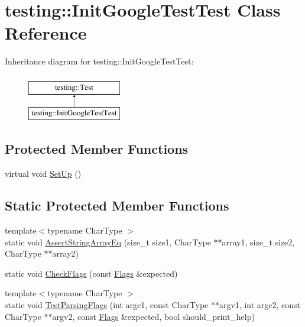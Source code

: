 \hypertarget{classtesting_1_1_init_google_test_test}{\section{testing\-:\-:Init\-Google\-Test\-Test Class Reference}
\label{classtesting_1_1_init_google_test_test}
}
Inheritance diagram for testing\-:\-:Init\-Google\-Test\-Test\-:\begin{figure}[H]
\begin{center}
\leavevmode
\includegraphics[height=2.000000cm]{classtesting_1_1_init_google_test_test}
\end{center}
\end{figure}
\subsection*{Protected Member Functions}
\begin{DoxyCompactItemize}
\item 
virtual void \hyperlink{classtesting_1_1_init_google_test_test_a49de9e552ea788c4b79924ec4135ca7a}{Set\-Up} ()
\end{DoxyCompactItemize}
\subsection*{Static Protected Member Functions}
\begin{DoxyCompactItemize}
\item 
{\footnotesize template$<$typename Char\-Type $>$ }\\static void \hyperlink{classtesting_1_1_init_google_test_test_af32acd91b1185c6868072009dce55a7b}{Assert\-String\-Array\-Eq} (size\-\_\-t size1, Char\-Type $\ast$$\ast$array1, size\-\_\-t size2, Char\-Type $\ast$$\ast$array2)
\item 
static void \hyperlink{classtesting_1_1_init_google_test_test_aac37d5d592202bf6614b02fe0b4da9d2}{Check\-Flags} (const \hyperlink{structtesting_1_1_flags}{Flags} \&expected)
\item 
{\footnotesize template$<$typename Char\-Type $>$ }\\static void \hyperlink{classtesting_1_1_init_google_test_test_add290338cf429308d0ab275ae4c46e69}{Test\-Parsing\-Flags} (int argc1, const Char\-Type $\ast$$\ast$argv1, int argc2, const Char\-Type $\ast$$\ast$argv2, const \hyperlink{structtesting_1_1_flags}{Flags} \&expected, bool should\-\_\-print\-\_\-help)
\end{DoxyCompactItemize}
